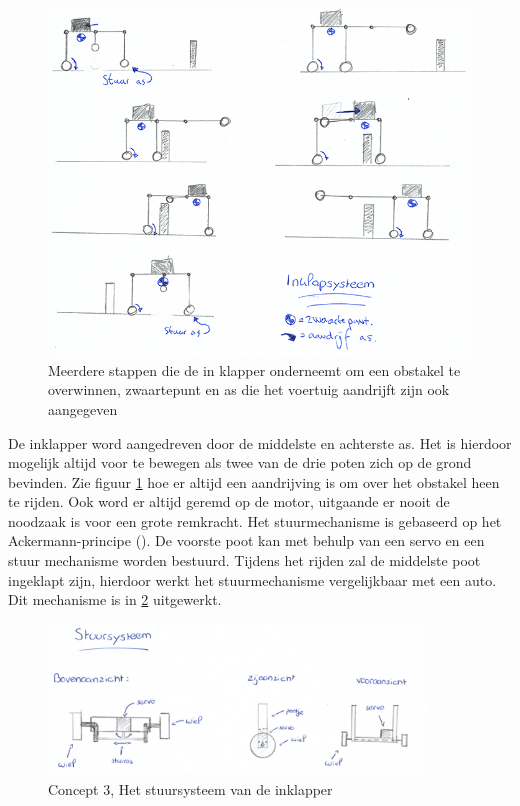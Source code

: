 \begin{figure}[H]
    \includegraphics[width=120mm]{04_idee_ontwikkeling/Verloop_systeem_driepoten.png}
    \caption{Meerdere stappen die de in klapper onderneemt om een obstakel te overwinnen, zwaartepunt en as die het voertuig aandrijft zijn ook aangegeven}
    \label{fig:stappen_inklapper_met_pakket}
\end{figure}

De inklapper word aangedreven door de middelste en achterste as. Het is hierdoor mogelijk altijd voor te bewegen als twee van de drie poten zich op de grond bevinden. Zie figuur \cref{fig:stappen_inklapper_met_pakket} hoe er altijd een aandrijving is om over het obstakel heen te rijden. Ook word er altijd geremd op de motor, uitgaande er nooit de noodzaak is voor een grote remkracht.  Het stuurmechanisme is gebaseerd op het Ackermann-principe (\cite{Stuurmechanisme}). De voorste poot kan met behulp van een servo en een stuur mechanisme worden bestuurd. Tijdens het rijden zal de middelste poot ingeklapt zijn, hierdoor werkt het stuurmechanisme vergelijkbaar met een auto. Dit mechanisme is in \cref{fig:vierpoter_stuursysteem} uitgewerkt. \\ 

\begin{figure}[H]
    \includegraphics[width = 100mm]{04_conceptKeuze/Foto_stuursysteem.PNG}
    \caption{Concept 3, Het stuursysteem van de inklapper}
    \label{fig:vierpoter_stuursysteem}
\end{figure}

